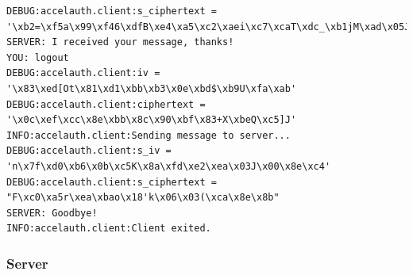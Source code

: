\documentclass{article}
\begin{document}
\begin{lstlisting}
DEBUG:accelauth.client:s_ciphertext = '\xb2=\xf5a\x99\xf46\xdfB\xe4\xa5\xc2\xaei\xc7\xcaT\xdc_\xb1jM\xad\x05J\xc4%m.\\\t\xf6P\x1b7\x1c\x97)iz\x15\n\xf0\xcf}\xf3ku'
SERVER: I received your message, thanks!
YOU: logout
DEBUG:accelauth.client:iv = '\x83\xed[Ot\x81\xd1\xbb\xb3\x0e\xbd$\xb9U\xfa\xab'
DEBUG:accelauth.client:ciphertext = '\x0c\xef\xcc\x8e\xbb\x8c\x90\xbf\x83+X\xbeQ\xc5]J'
INFO:accelauth.client:Sending message to server...
DEBUG:accelauth.client:s_iv = 'n\x7f\xd0\xb6\x0b\xc5K\x8a\xfd\xe2\xea\x03J\x00\x8e\xc4'
DEBUG:accelauth.client:s_ciphertext = "F\xc0\xa5r\xea\xbao\x18'k\x06\x03(\xca\x8e\x8b"
SERVER: Goodbye!
INFO:accelauth.client:Client exited.
\end{lstlisting}

\newpage
\subsubsection*{Server}
\end{document}
